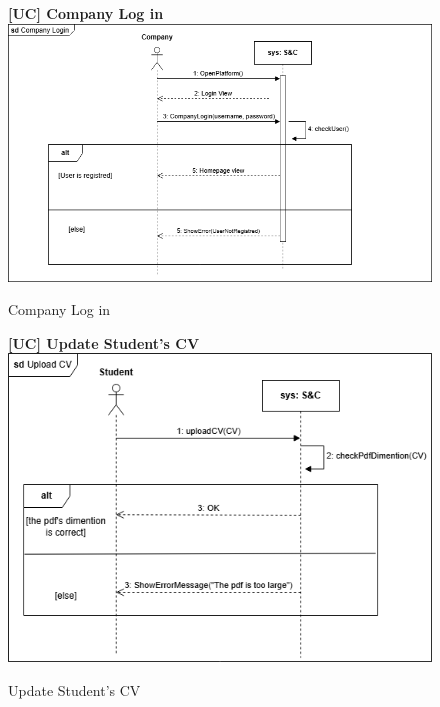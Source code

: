 \begin{figure}[H]
\textbf{[UC\nextUCDiagr] Company Log in}\newline\newline
\includegraphics[width=15cm]{Images/UC_diagram/RASD-UC4.drawio.png}
    \caption{Company Log in}
\end{figure}

\begin{figure}[H]
\textbf{[UC\nextUCDiagr] Update Student's CV}\newline\newline
\includegraphics[width=15cm]{Images/UC_diagram/RASD-UC5.drawio.png}
    \caption{Update Student's CV}
\end{figure}

